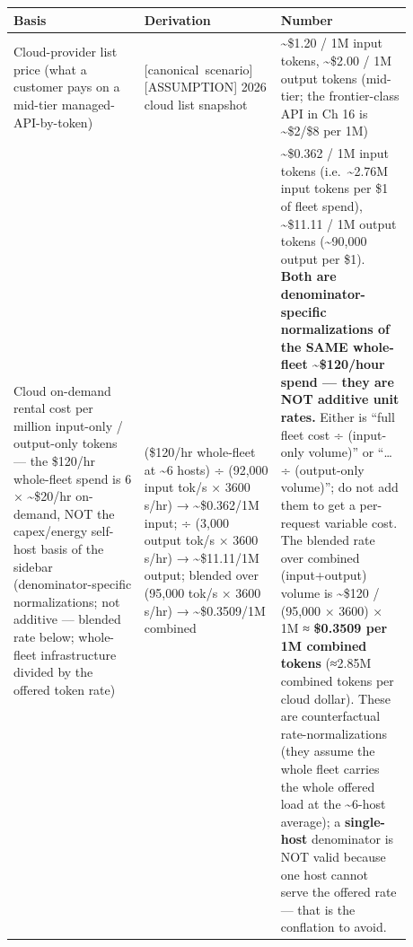 \nopagebreak[4]
\begin{longtable}[]{@{}
  >{\raggedright\arraybackslash}p{0.2927\linewidth}
  >{\raggedright\arraybackslash}p{0.2927\linewidth}
  >{\raggedright\arraybackslash}p{0.2927\linewidth}@{}}
\toprule\noalign{}
\begin{minipage}[b]{\linewidth}\raggedright
Basis
\end{minipage} & \begin{minipage}[b]{\linewidth}\raggedright
Derivation
\end{minipage} & \begin{minipage}[b]{\linewidth}\raggedright
Number
\end{minipage} \\
\midrule\noalign{}
\endhead
\bottomrule\noalign{}
\endlastfoot
Cloud-provider list price (what a customer pays on a mid-tier
managed-API-by-token) & \mbox{{[}canonical scenario{]}}\hspace{0pt}\mbox{{[}ASSUMPTION{]}} 2026
cloud list snapshot & \textasciitilde\$1.20 / 1M input tokens,
\textasciitilde\$2.00 / 1M output tokens (mid-tier; the frontier-class
API in Ch 16 is \textasciitilde\$2/\$8 per 1M) \\
\noalign{\label{tab:4.6}}
Cloud on-demand rental cost per million input-only / output-only tokens
--- the \$120/hr whole-fleet spend is 6 × \textasciitilde\$20/hr
on-demand, NOT the capex/energy self-host basis of the sidebar
(denominator-specific normalizations; not additive --- blended rate
below; whole-fleet infrastructure divided by the offered token rate) &
(\$120/hr whole-fleet at \textasciitilde6 hosts) ÷ (92,000 input tok/s ×
3600 s/hr) → \textasciitilde\$0.362/1M input; ÷ (3,000 output tok/s ×
3600 s/hr) → \textasciitilde\$11.11/1M output; blended over (95,000
tok/s × 3600 s/hr) → \textasciitilde\$0.3509/1M combined &
\textasciitilde\$0.362 / 1M input tokens (i.e.~\textasciitilde2.76M
input tokens per \$1 of fleet spend), \textasciitilde\$11.11 / 1M output
tokens (\textasciitilde90,000 output per \$1). \textbf{Both are
denominator-specific normalizations of the SAME whole-fleet
\textasciitilde\$120/hour spend --- they are NOT additive unit rates.}
Either is ``full fleet cost ÷ (input-only volume)'' or ``\ldots÷
(output-only volume)''; do not add them to get a per-request variable
cost. The blended rate over combined (input+output) volume is
\textasciitilde\$120 / (95,000 × 3600) × 1M ≈ \textbf{\$0.3509 per 1M
combined tokens} (≈2.85M combined tokens per cloud dollar). These are
counterfactual rate-normalizations (they assume the whole fleet carries
the whole offered load at the \textasciitilde6-host average); a
\textbf{single-host} denominator is NOT valid because one host cannot
serve the offered rate --- that is the conflation to avoid. \\
\end{longtable}

